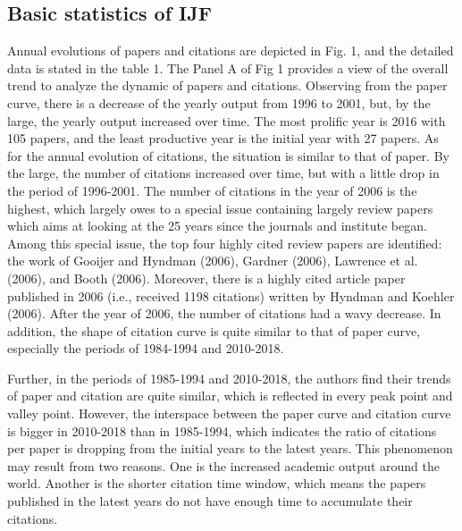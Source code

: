 \documentclass[11pt,a4paper]{elsarticle} %
\begin{document}
\subsection{Basic statistics of IJF}\label{basic-statistics-of-ijf}

Annual evolutions of papers and citations are depicted in Fig. 1, and
the detailed data is stated in the table 1. The Panel A of Fig 1
provides a view of the overall trend to analyze the dynamic of papers
and citations. Observing from the paper curve, there is a decrease of
the yearly output from 1996 to 2001, but, by the large, the yearly
output increased over time. The most prolific year is 2016 with 105
papers, and the least productive year is the initial year with 27
papers. As for the annual evolution of citations, the situation is
similar to that of paper. By the large, the number of citations
increased over time, but with a little drop in the period of 1996-2001.
The number of citations in the year of 2006 is the highest, which
largely owes to a special issue containing largely review papers which
aims at looking at the 25 years since the journals and institute began.
Among this special issue, the top four highly cited review papers are
identified: the work of Gooijer and Hyndman (2006), Gardner (2006),
Lawrence et al. (2006), and Booth (2006). Moreover, there is a highly
cited article paper published in 2006 (i.e., received 1198 citations)
written by Hyndman and Koehler (2006). After the year of 2006, the
number of citations had a wavy decrease. In addition, the shape of
citation curve is quite similar to that of paper curve, especially the
periods of 1984-1994 and 2010-2018.

Further, in the periods of 1985-1994 and 2010-2018, the authors find
their trends of paper and citation are quite similar, which is reflected
in every peak point and valley point. However, the interspace between
the paper curve and citation curve is bigger in 2010-2018 than in
1985-1994, which indicates the ratio of citations per paper is dropping
from the initial years to the latest years. This phenomenon may result
from two reasons. One is the increased academic output around the world.
Another is the shorter citation time window, which means the papers
published in the latest years do not have enough time to accumulate
their citations.
\end{document}
